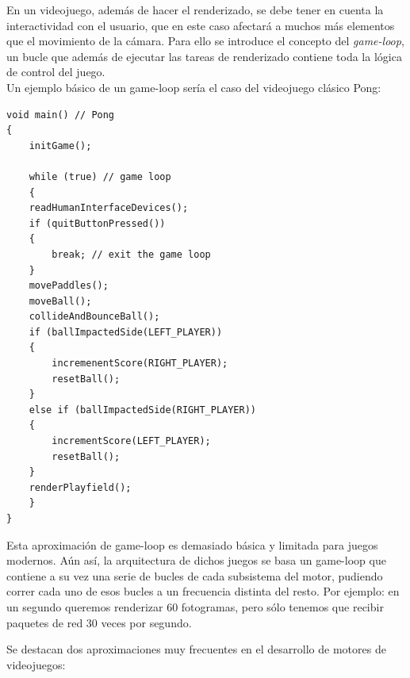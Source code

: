 \documentclass[a4paper,12pt]{report}
\begin{document}
	
	En un videojuego, además de hacer el renderizado, se debe tener en cuenta la interactividad con el usuario, que en este caso afectará a muchos más elementos que el movimiento de la cámara. %
	Para ello se introduce el concepto del \textit{game-loop}, un bucle que además de ejecutar las tareas de renderizado contiene toda la lógica de control del juego.\\
	
	 Un ejemplo básico de un game-loop sería el caso del videojuego clásico Pong:
	

	
		\begin{lstlisting}[style=C, numbers=none]
void main() // Pong
{
	initGame();
		
	while (true) // game loop
	{
	readHumanInterfaceDevices();
	if (quitButtonPressed())
	{
		break; // exit the game loop
	}
	movePaddles();
	moveBall();
	collideAndBounceBall();
	if (ballImpactedSide(LEFT_PLAYER))
	{
		incremenentScore(RIGHT_PLAYER);
		resetBall();
	}
	else if (ballImpactedSide(RIGHT_PLAYER))
	{
		incrementScore(LEFT_PLAYER);
		resetBall();
	}
	renderPlayfield();
	}
}
	\end{lstlisting}
	
	Esta aproximación de game-loop es demasiado básica y limitada para juegos modernos. Aún así, la arquitectura de dichos juegos se basa un game-loop que contiene a su vez una serie de bucles de cada subsistema del motor, pudiendo correr cada uno de esos bucles a un frecuencia distinta del resto. Por ejemplo: en un segundo queremos renderizar 60 fotogramas, pero sólo tenemos que recibir paquetes de red 30 veces por segundo. 
	
	Se destacan dos aproximaciones muy frecuentes en el desarrollo de motores de videojuegos:
	
\end{document}
